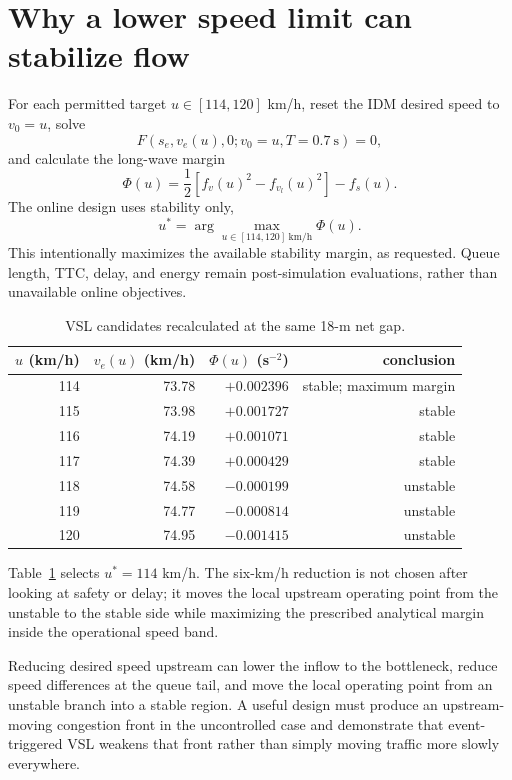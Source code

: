 \documentclass[11pt,a4paper,openany]{book}
\numberwithin{equation}{chapter}
\numberwithin{figure}{chapter}
\numberwithin{table}{chapter}
\begin{document}
\section{Why a lower speed limit can stabilize flow}
For each permitted target $u\in[114,120]$ km/h, reset the IDM desired speed to $v_0=u$, solve
\begin{equation}
F(s_e,v_e(u),0;v_0=u,T=0.7\ \mathrm{s})=0,
\end{equation}
and calculate the long-wave margin
\begin{equation}
\Phi(u)=\frac12[f_v(u)^2-f_{v_l}(u)^2]-f_s(u).
\label{eq:vsl-phi}
\end{equation}
The online design uses stability only,
\begin{equation}
u^*=\arg\max_{u\in[114,120]\ \mathrm{km/h}}\Phi(u).
\label{eq:vsl-stability-only-objective}
\end{equation}
This intentionally maximizes the available stability margin, as requested. Queue length, TTC, delay, and energy remain post-simulation evaluations, rather than unavailable online objectives.

\begin{table}[htbp]\centering\caption{VSL candidates recalculated at the same 18-m net gap.}\label{tab:vsl-candidates}
\begin{tabular}{rrrr}\toprule
$u$ (km/h) & $v_e(u)$ (km/h) & $\Phi(u)$ (s$^{-2}$) & conclusion\\\midrule
114 & 73.78 & $+0.002396$ & stable; maximum margin\\
115 & 73.98 & $+0.001727$ & stable\\
116 & 74.19 & $+0.001071$ & stable\\
117 & 74.39 & $+0.000429$ & stable\\
118 & 74.58 & $-0.000199$ & unstable\\
119 & 74.77 & $-0.000814$ & unstable\\
120 & 74.95 & $-0.001415$ & unstable\\\bottomrule
\end{tabular}\end{table}
Table~\ref{tab:vsl-candidates} selects $u^*=114$ km/h. The six-km/h reduction is not chosen after looking at safety or delay; it moves the local upstream operating point from the unstable to the stable side while maximizing the prescribed analytical margin inside the operational speed band.

Reducing desired speed upstream can lower the inflow to the bottleneck, reduce speed differences at the queue tail, and move the local operating point from an unstable branch into a stable region. A useful design must produce an upstream-moving congestion front in the uncontrolled case and demonstrate that event-triggered VSL weakens that front rather than simply moving traffic more slowly everywhere.
\end{document}
